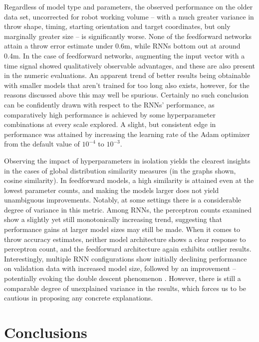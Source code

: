 \documentclass{article}
\begin{document}
Regardless of model type and parameters, the observed performance on the older data set, uncorrected for robot working volume -- with a much greater variance in throw shape, timing, starting orientation and target coordinates, but only marginally greater size -- is significantly worse. None of the feedforward networks attain a throw error estimate under 0.6m, while RNNs bottom out at around 0.4m. In the case of feedforward networks, augmenting the input vector with a time signal showed qualitatively observable advantages, and these are also present in the numeric evaluations. An apparent trend of better results being obtainable with smaller models that aren't trained for too long also exists, however, for the reasons discussed above this may well be spurious. Certainly no such conclusion can be confidently drawn with respect to the RNNs' performance, as comparatively high performance is achieved by some hyperparameter combinations at every scale explored. A slight, but consistent edge in performance was attained by increasing the learning rate of the Adam optimizer from the default value of $10^{-4}$ to $10^{-3}$.

Observing the impact of hyperparameters in isolation yields the clearest insights in the cases of global distribution similarity measures (in the graphs shown, cosine similarity). In feedforward models, a high similarity is attained even at the lowest parameter counts, and making the models larger does not yield unambiguous improvements. Notably, at some settings there is a considerable degree of variance in this metric. Among RNNs, the perceptron counts examined show a slightly yet still monotonically increasing trend, suggesting that performance gains at larger model sizes may still be made. When it comes to throw accuracy estimates, neither model architecture shows a clear response to perceptron count, and the feedforward architecture again exhibits outlier results. Interestingly, multiple RNN configurations show initially declining performance on validation data with increased model size, followed by an improvement -- potentially evoking the double descent phenomenon \citep{nakkiran2021deep}. However, there is still a comparable degree of unexplained variance in the results, which forces us to be cautious in proposing any concrete explanations.

\section{Conclusions}
\end{document}
